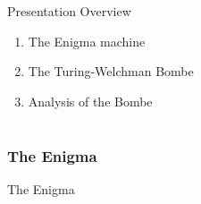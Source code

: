 \documentclass[hyphens,aspectratio=169]{beamer}
\begin{document}
\begin{frame}[fragile]{Presentation Overview}
	\begin{enumerate}
		\item The Enigma machine
		      \pause
		      \vspace{5mm}
		\item The Turing-Welchman Bombe
		      \pause
		      \vspace{5mm}

		\item Analysis of the Bombe
	\end{enumerate}

\end{frame}


\part{}

\section{The Enigma}

\begin{frame}[fragile]{}
	\Huge
	\begin{center}
		The Enigma
	\end{center}
\end{frame}
\end{document}
